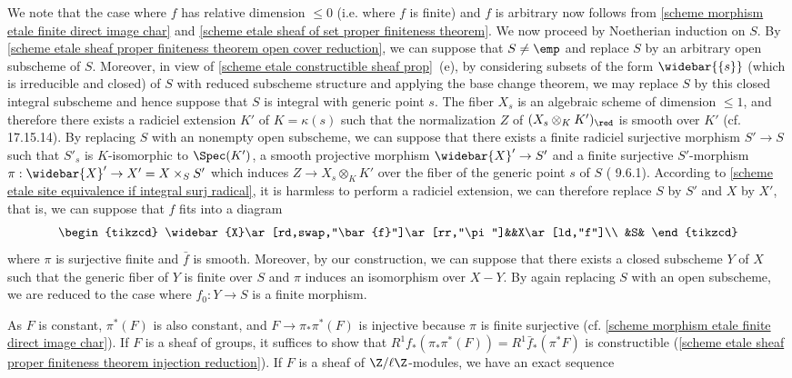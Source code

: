 We note that the case where $f$ has relative dimension $\leq 0$ (i.e. where $f$ is finite) and $f$ is arbitrary now follows from \cref{scheme morphism etale finite direct image char} and \cref{scheme etale sheaf of set proper finiteness theorem}. We now proceed by Noetherian induction on $S$. By \cref{scheme etale sheaf proper finiteness theorem open cover reduction}, we can suppose that $S\neq\emp$ and replace $S$ by an arbitrary open subscheme of $S$. Moreover, in view of \cref{scheme etale constructible sheaf prop}~(e), by considering subsets of the form $\widebar{\{s\}}$ (which is irreducible and closed) of $S$ with reduced subscheme structure and applying the base change theorem, we may replace $S$ by this closed integral subscheme and hence suppose that $S$ is integral with generic point $s$. The fiber $X_s$ is an algebraic scheme of dimension $\leq 1$, and therefore there exists a radiciel extension $K'$ of $K=\kappa(s)$ such that the normalization $Z$ of $(X_s\otimes_KK')_\red$ is smooth over $K'$ (cf. \cite{EGA4-4} 17.15.14). By replacing $S$ with an nonempty open subscheme, we can suppose that there exists a finite radiciel surjective morphism $S'\to S$ such that $S'_s$ is $K$-isomorphic to $\Spec(K')$, a smooth projective morphism $\widebar{X}'\to S'$ and a finite surjective $S'$-morphism $\pi:\widebar{X}'\to X'=X\times_SS'$ which induces $Z\to X_s\otimes_KK'$ over the fiber of the generic point $s$ of $S$ (\cite{EGA4-3} 9.6.1). According to \cref{scheme etale site equivalence if integral surj radical}, it is harmless to perform a radiciel extension, we can therefore replace $S$ by $S'$ and $X$ by $X'$, that is, we can suppose that $f$ fits into a diagram
\[\begin{tikzcd}
\widebar{X}\ar[rd,swap,"\bar{f}"]\ar[rr,"\pi"]&&X\ar[ld,"f"]\\
&S&
\end{tikzcd}\]
where $\pi$ is surjective finite and $\bar{f}$ is smooth. Moreover, by our construction, we can suppose that there exists a closed subscheme $Y$ of $X$ such that the generic fiber of $Y$ is finite over $S$ and $\pi$ induces an isomorphism over $X-Y$. By again replacing $S$ with an open subscheme, we are reduced to the case where $f_0:Y\to S$ is a finite morphism.\par
As $F$ is constant, $\pi^*(F)$ is also constant, and $F\to\pi_*\pi^*(F)$ is injective because $\pi$ is finite surjective (cf. \cref{scheme morphism etale finite direct image char}). If $F$ is a sheaf of groups, it suffices to show that $R^1f_*(\pi_*\pi^*(F))=R^1\bar{f}_*(\pi^*F)$ is constructible (\cref{scheme etale sheaf proper finiteness theorem injection reduction}). If $F$ is a sheaf of $\Z/\ell\Z$-modules, we have an exact sequence
